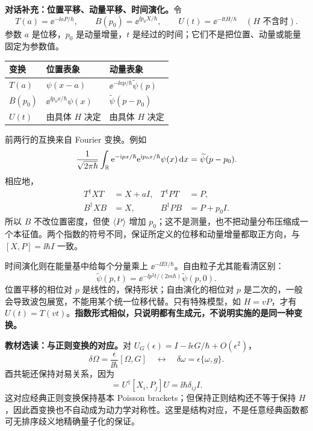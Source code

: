 \textbf{对话补充：位置平移、动量平移、时间演化。}令
\begin{equation}
  T(a)=\ee^{-\ii aP/\hbar},\qquad
  B(p_0)=\ee^{\ii p_0X/\hbar},\qquad
  U(t)=\ee^{-\ii tH/\hbar}\quad(H\text{ 不含时}).
\end{equation}
参数 $a$ 是位移，$p_0$ 是动量增量，$t$ 是经过的时间；它们不是把位置、动量或能量固定为参数值。
\begin{center}
\small
\renewcommand{\arraystretch}{1.3}
\begin{tabularx}{\textwidth}{@{}lXX@{}}
  \toprule
  变换 & 位置表象 & 动量表象 \\
  \midrule
  $T(a)$ & $\psi(x-a)$ & $\ee^{-\ii ap/\hbar}\widetilde\psi(p)$ \\
  $B(p_0)$ & $\ee^{\ii p_0x/\hbar}\psi(x)$ & $\widetilde\psi(p-p_0)$ \\
  $U(t)$ & 由具体 $H$ 决定 & 由具体 $H$ 决定 \\
  \bottomrule
\end{tabularx}
\end{center}
前两行的互换来自 Fourier 变换。例如
\begin{equation}
  \frac1{\sqrt{2\pi\hbar}}\int_{\mathbb{R}}
    \mathrm{e}^{-\mathrm{i} px/\hbar}\mathrm{e}^{\mathrm{i} p_0x/\hbar}\psi(x)\mathop{}\!\mathrm{d} x
     =\widetilde\psi(p-p_0).
\end{equation}
相应地，
\begin{align}
  T^\dagger XT&=X+aI,& T^\dagger PT&=P,\\
  B^\dagger XB&=X,& B^\dagger PB&=P+p_0I.
\end{align}
所以 $B$ 不改位置密度，但使 $\left\langle P \right\rangle$ 增加 $p_0$；这不是测量，也不把动量分布压缩成一个本征值。两个指数的符号不同，保证所定义的位移和动量增量都取正方向，与 $[X,P]=\ii\hbar I$ 一致。

时间演化则在能量基中给每个分量乘上 $\ee^{-\ii Et/\hbar}$。自由粒子尤其能看清区别：
\begin{equation}
  \widetilde\psi(p,t)=\ee^{-\ii p^2t/(2m\hbar)}\widetilde\psi(p,0).
\end{equation}
位置平移的相位对 $p$ 是线性的，保持形状；自由演化的相位对 $p$ 是二次的，一般会导致波包展宽，不能用某个统一位移代替。只有特殊模型，如 $H=vP$，才有 $U(t)=T(vt)$。\textbf{指数形式相似，只说明都有生成元，不说明实施的是同一种变换。}

\textbf{教材选读：与正则变换的对应。}对 $U_G(\epsilon)=I-\ii\epsilon G/\hbar+O(\epsilon^2)$，
\begin{equation}
  \delta\Omega=\frac{\epsilon}{\ii\hbar}[\Omega,G]
  \quad\longleftrightarrow\quad
  \delta\omega=\epsilon\{\omega,g\}.
\end{equation}
酉共轭还保持对易关系，因为
\begin{equation}
  [U^\dagger X_iU,U^\dagger P_jU]
    =U^\dagger[X_i,P_j]U=\ii\hbar\delta_{ij}I.
\end{equation}
这对应经典正则变换保持基本 Poisson brackets；但保持正则结构还不等于保持 $H$，因此酉变换也不自动成为动力学对称性。这里是结构对应，不是任意经典函数都可无排序歧义地精确量子化的保证。

